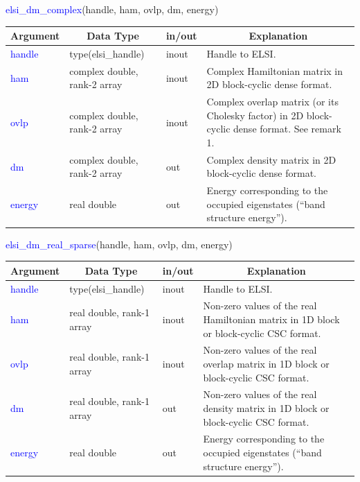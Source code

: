 \documentclass{report}
\begin{document}
\newpage
\begin{labeling}{\hspace{6cm}}
\item [\hspace{0.3cm} \textcolor{blue}{elsi\_dm\_complex}(handle, ham, ovlp, dm, energy)]
\end{labeling}

\begin{tabular}[]{|p{20mm}|p{45mm}|p{15mm}|p{85mm}|}
\hline
\multicolumn{1}{|c|}{\textbf{Argument}} & \multicolumn{1}{c|}{\textbf{Data Type}} & \multicolumn{1}{c|}{\textbf{in/out}} & \multicolumn{1}{c|}{\textbf{Explanation}}\\
\hline
\textcolor{blue}{handle} & type(elsi\_handle)           & inout & Handle to ELSI.\\
\hline
\textcolor{blue}{ham}    & complex double, rank-2 array & inout & Complex Hamiltonian matrix in 2D block-cyclic dense format.\\
\hline
\textcolor{blue}{ovlp}   & complex double, rank-2 array & inout & Complex overlap matrix (or its Cholesky factor) in 2D block-cyclic dense format.  See remark 1.\\
\hline
\textcolor{blue}{dm}     & complex double, rank-2 array & out   & Complex density matrix in 2D block-cyclic dense format.\\
\hline
\textcolor{blue}{energy} & real double                  & out   & Energy corresponding to the occupied eigenstates (``band structure energy'').\\
\hline
\end{tabular}

\bigskip
\begin{labeling}{\hspace{6cm}}
\item [\hspace{0.3cm} \textcolor{blue}{elsi\_dm\_real\_sparse}(handle, ham, ovlp, dm, energy)]
\end{labeling}

\begin{tabular}[]{|p{20mm}|p{45mm}|p{15mm}|p{85mm}|}
\hline
\multicolumn{1}{|c|}{\textbf{Argument}} & \multicolumn{1}{c|}{\textbf{Data Type}} & \multicolumn{1}{c|}{\textbf{in/out}} & \multicolumn{1}{c|}{\textbf{Explanation}}\\
\hline
\textcolor{blue}{handle} & type(elsi\_handle)        & inout & Handle to ELSI.\\
\hline
\textcolor{blue}{ham}    & real double, rank-1 array & inout & Non-zero values of the real Hamiltonian matrix in 1D block or block-cyclic CSC format.\\
\hline
\textcolor{blue}{ovlp}   & real double, rank-1 array & inout & Non-zero values of the real overlap matrix in 1D block or block-cyclic CSC format.\\
\hline
\textcolor{blue}{dm}     & real double, rank-1 array & out   & Non-zero values of the real density matrix in 1D block or block-cyclic CSC format.\\
\hline
\textcolor{blue}{energy} & real double               & out   & Energy corresponding to the occupied eigenstates (``band structure energy'').\\
\hline
\end{tabular}
\end{document}
